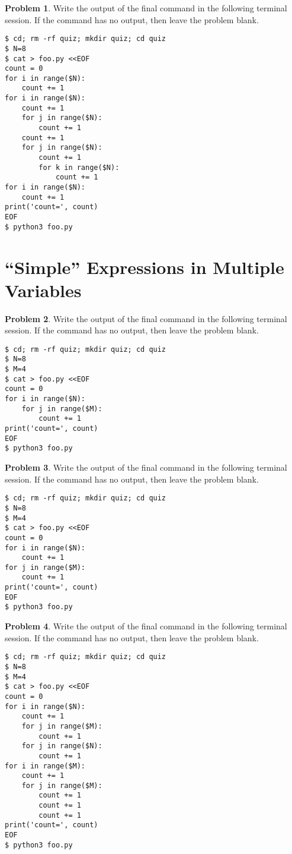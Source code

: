 \documentclass[10pt]{article}
\theoremstyle{definition}
\newtheorem{problem}{Problem}
\begin{document}
\filbreak
\begin{problem}
    Write the output of the final command in the following terminal session.
    If the command has no output, then leave the problem blank.
\end{problem}
\begin{lstlisting}
$ cd; rm -rf quiz; mkdir quiz; cd quiz
$ N=8
$ cat > foo.py <<EOF
count = 0
for i in range($N):
    count += 1
for i in range($N):
    count += 1
    for j in range($N):
        count += 1
    count += 1
    for j in range($N):
        count += 1
        for k in range($N):
            count += 1
for i in range($N):
    count += 1
print('count=', count)
EOF
$ python3 foo.py
\end{lstlisting}
\vspace{0.4in}

\filbreak
\section{``Simple'' Expressions in Multiple Variables}

\begin{problem}
    Write the output of the final command in the following terminal session.
    If the command has no output, then leave the problem blank.
\end{problem}
\begin{lstlisting}
$ cd; rm -rf quiz; mkdir quiz; cd quiz
$ N=8
$ M=4
$ cat > foo.py <<EOF
count = 0
for i in range($N):
    for j in range($M):
        count += 1
print('count=', count)
EOF
$ python3 foo.py
\end{lstlisting}
\vspace{0.4in}

\filbreak
\begin{problem}
    Write the output of the final command in the following terminal session.
    If the command has no output, then leave the problem blank.
\end{problem}
\begin{lstlisting}
$ cd; rm -rf quiz; mkdir quiz; cd quiz
$ N=8
$ M=4
$ cat > foo.py <<EOF
count = 0
for i in range($N):
    count += 1
for j in range($M):
    count += 1
print('count=', count)
EOF
$ python3 foo.py
\end{lstlisting}
\vspace{0.4in}

\filbreak
\begin{problem}
    Write the output of the final command in the following terminal session.
    If the command has no output, then leave the problem blank.
\end{problem}
\begin{lstlisting}
$ cd; rm -rf quiz; mkdir quiz; cd quiz
$ N=8
$ M=4
$ cat > foo.py <<EOF
count = 0
for i in range($N):
    count += 1
    for j in range($M):
        count += 1
    for j in range($N):
        count += 1
for i in range($M):
    count += 1
    for j in range($M):
        count += 1
        count += 1
        count += 1
print('count=', count)
EOF
$ python3 foo.py
\end{lstlisting}
\vspace{0.4in}
\end{document}
